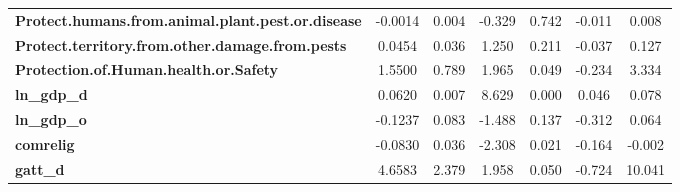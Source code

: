 \begin{center}
\begin{tabular}{lcccccc}
\textbf{Protect.humans.from.animal.plant.pest.or.disease}          &      -0.0014  &        0.004     &    -0.329  &         0.742        &       -0.011    &        0.008     \\
\textbf{Protect.territory.from.other.damage.from.pests}            &       0.0454  &        0.036     &     1.250  &         0.211        &       -0.037    &        0.127     \\
\textbf{Protection.of.Human.health.or.Safety}                      &       1.5500  &        0.789     &     1.965  &         0.049        &       -0.234    &        3.334     \\
\textbf{ln\_gdp\_d}                                                &       0.0620  &        0.007     &     8.629  &         0.000        &        0.046    &        0.078     \\
\textbf{ln\_gdp\_o}                                                &      -0.1237  &        0.083     &    -1.488  &         0.137        &       -0.312    &        0.064     \\
\textbf{comrelig}                                                  &      -0.0830  &        0.036     &    -2.308  &         0.021        &       -0.164    &       -0.002     \\
\textbf{gatt\_d}                                                   &       4.6583  &        2.379     &     1.958  &         0.050        &       -0.724    &       10.041     \\
\bottomrule
\end{tabular}
\end{center}